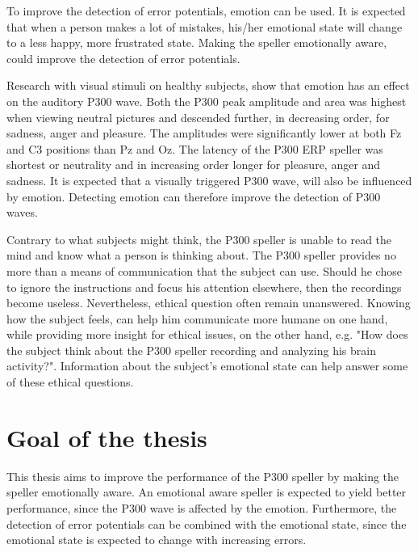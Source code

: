 \npar

To improve the detection of error potentials, emotion can be used. It is expected that when a person makes a lot of mistakes, his/her emotional state will change to a less happy, more frustrated state. Making the speller emotionally aware, could improve the detection of error potentials.

\npar

Research with visual stimuli on healthy subjects, show that emotion has an effect on the auditory P300 wave\cite{AuditoryP300Effect}. Both the P300 peak amplitude and area was highest when viewing neutral pictures and descended further, in decreasing order, for sadness, anger and pleasure. The amplitudes were significantly lower at both Fz and C3 positions than Pz and Oz. The latency of the P300 ERP speller was shortest or neutrality and in increasing order longer for pleasure, anger and sadness. It is expected that a visually triggered P300 wave, will also be influenced by emotion. Detecting emotion can therefore improve the detection of P300 waves.

\npar

Contrary to what subjects might think, the P300 speller is unable to read the mind and know what a person is thinking about\cite{P300Origin}. The P300 speller provides no more than a means of communication that the subject can use. Should he chose to ignore the instructions and focus his attention elsewhere, then the recordings become useless. Nevertheless, ethical question often remain unanswered. Knowing how the subject feels, can help him communicate more humane on one hand, while providing more insight for ethical issues, on the other hand, e.g. "How does the subject think about the P300 speller recording and analyzing his brain activity?". Information about the subject's emotional state can help answer some of these ethical questions.


\section{Goal of the thesis}

This thesis aims to improve the performance of the P300 speller by making the speller emotionally aware. An emotional aware speller is expected to yield better performance, since the P300 wave is affected by the emotion. Furthermore, the detection of error potentials can be combined with the emotional state, since the emotional state is expected to change with increasing errors.

